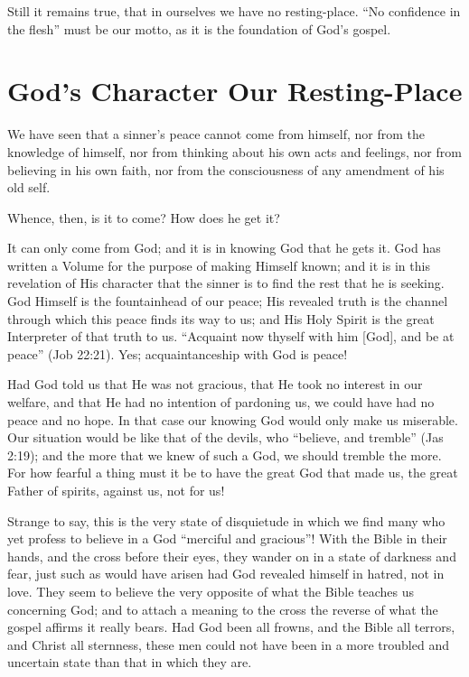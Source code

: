 \documentclass[
]{book}
\begin{document}
Still it remains true, that in ourselves we have no resting-place. ``No confidence in the flesh'' must be our motto, as it is the foundation of God's gospel.

\hypertarget{gods-character-our-resting-place}{%
\chapter{God's Character Our Resting-Place}\label{gods-character-our-resting-place}}

We have seen that a sinner's peace cannot come from himself, nor from the knowledge of himself, nor from thinking about his own acts and feelings, nor from believing in his own faith, nor from the consciousness of any amendment of his old self.

Whence, then, is it to come? How does he get it?

It can only come from God; and it is in knowing God that he gets it. God has written a Volume for the purpose of making Himself known; and it is in this revelation of His character that the sinner is to find the rest that he is seeking. God Himself is the fountainhead of our peace; His revealed truth is the channel through which this peace finds its way to us; and His Holy Spirit is the great Interpreter of that truth to us. ``Acquaint now thyself with him {[}God{]}, and be at peace'' (Job 22:21). Yes; acquaintanceship with God is peace!

Had God told us that He was not gracious, that He took no interest in our welfare, and that He had no intention of pardoning us, we could have had no peace and no hope. In that case our knowing God would only make us miserable. Our situation would be like that of the devils, who ``believe, and tremble'' (Jas 2:19); and the more that we knew of such a God, we should tremble the more. For how fearful a thing must it be to have the great God that made us, the great Father of spirits, against us, not for us!

Strange to say, this is the very state of disquietude in which we find many who yet profess to believe in a God ``merciful and gracious''! With the Bible in their hands, and the cross before their eyes, they wander on in a state of darkness and fear, just such as would have arisen had God revealed himself in hatred, not in love. They seem to believe the very opposite of what the Bible teaches us concerning God; and to attach a meaning to the cross the reverse of what the gospel affirms it really bears. Had God been all frowns, and the Bible all terrors, and Christ all sternness, these men could not have been in a more troubled and uncertain state than that in which they are.
\end{document}
